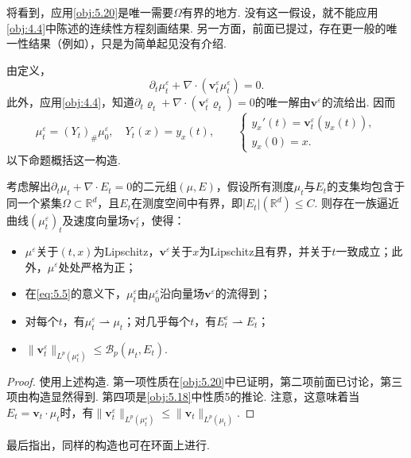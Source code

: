 将看到，应用\autoref{obj:5.20}是唯一需要$\Omega$有界的地方. 没有这一假设，就不能应用\autoref{obj:4.4}中陈述的连续性方程刻画结果. 另一方面，前面已提过，存在更一般的唯一性结果（例如\cite{b15}），只是为简单起见没有介绍.

由定义，
\[
\partial_t\mu_t^\varepsilon+\nabla\cdot(\mathbf v_t^\varepsilon\mu_t^\varepsilon)=0.
\]
此外，应用\autoref{obj:4.4}，知道$\partial_t\varrho_t+\nabla\cdot(\mathbf v_t^\varepsilon\varrho_t)=0$的唯一解由$\mathbf v^\varepsilon$的流给出. 因而
\begin{equation}\label{eq:5.5}
\mu_t^\varepsilon=(Y_t)_\#\mu_0^\varepsilon,
\quad Y_t(x)=y_x(t),\qquad
\begin{cases}y_x'(t)=\mathbf v_t^\varepsilon(y_x(t)),\\y_x(0)=x.\end{cases}
\end{equation}
以下命题概括这一构造.

\begin{proposition}\label{obj:5.21}
考虑解出$\partial_t\mu_t+\nabla\cdot E_t=0$的二元组$(\mu,E)$，假设所有测度$\mu_t$与$E_t$的支集均包含于同一个紧集$\Omega\subset\mathbb R^d$，且$E_t$在测度空间中有界，即$|E_t|(\mathbb R^d)\le C$. 则存在一族逼近曲线$(\mu_t^\varepsilon)_t$及速度向量场$\mathbf v_t^\varepsilon$，使得：
\begin{itemize}
\item $\mu^\varepsilon$关于$(t,x)$为Lipschitz，$\mathbf v^\varepsilon$关于$x$为Lipschitz且有界，并关于$t$一致成立；此外，$\mu^\varepsilon$处处严格为正；
\item 在\eqref{eq:5.5}的意义下，$\mu_t^\varepsilon$由$\mu_0^\varepsilon$沿向量场$\mathbf v^\varepsilon$的流得到；
\item 对每个$t$，有$\mu_t^\varepsilon\rightharpoonup\mu_t$；对几乎每个$t$，有$E_t^\varepsilon\rightharpoonup E_t$；
\item $\|\mathbf v_t^\varepsilon\|_{L^p(\mu_t^\varepsilon)}\le\mathscr B_p(\mu_t,E_t)$.
\end{itemize}
\end{proposition}
\begin{proof}
使用上述构造. 第一项性质在\autoref{obj:5.20}中已证明，第二项前面已讨论，第三项由构造显然得到. 第四项是\autoref{obj:5.18}中性质5的推论. 注意，这意味着当$E_t=\mathbf v_t\cdot\mu_t$时，有$\|\mathbf v_t^\varepsilon\|_{L^p(\mu_t^\varepsilon)}\le\|\mathbf v_t\|_{L^p(\mu_t)}$.
\end{proof}

最后指出，同样的构造也可在环面上进行.

